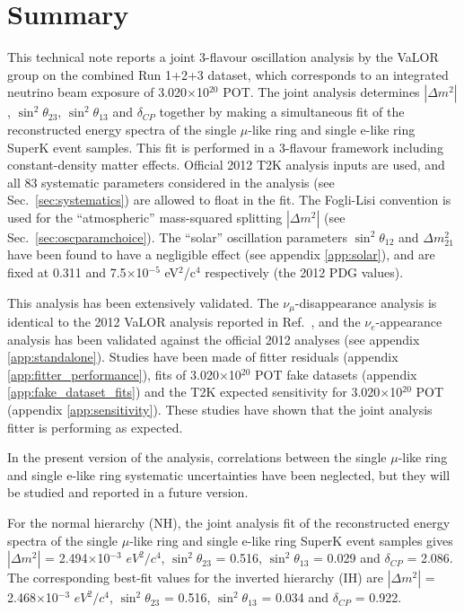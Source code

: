 \clearpage 

\section {Summary}
\label{sec:summary}

This technical note reports a joint 3-flavour oscillation analysis by the VaLOR group on the combined Run 1+2+3 dataset, 
which corresponds to an integrated neutrino beam exposure of 3.020$\times$10$^{20}$ POT. 
The joint analysis determines $|\Delta m^{2}|$, $\sin^{2} \theta_{23}$,  $\sin^{2} \theta_{13}$ and $\delta_{CP}$ together 
by making a simultaneous fit of the reconstructed energy spectra of the single $\mu$-like ring and single e-like ring SuperK event samples. 
This fit is performed in a 3-flavour framework including constant-density matter effects. Official 2012 T2K analysis inputs are used, 
and all 83 systematic parameters considered in the analysis (see Sec.\ \ref{sec:systematics}) are allowed to float in the fit. 
The Fogli-Lisi convention is used for the ``atmospheric'' mass-squared splitting $|\Delta m^{2}|$ (see Sec.\ \ref{sec:oscparamchoice}). 
The ``solar'' oscillation parameters $\sin^{2} \theta_{12}$ and $\Delta m_{21}^{2}$ have been found to have a negligible effect (see appendix \ref{app:solar}), 
and are fixed at 0.311 and 7.5$\times$10$^{-5}$ eV$^{2}$/c$^{4}$ respectively (the 2012 PDG values). 

This analysis has been extensively validated. The $\nu_{\mu}$-disappearance analysis is identical to the 2012 VaLOR analysis reported in Ref.\ \cite{OurRun123DisappAnalysis3Flavour}, 
and the $\nu_{e}$-appearance analysis has been validated against the official 2012 analyses (see appendix \ref{app:standalone}). 
Studies have been made of fitter residuals (appendix \ref{app:fitter_performance}), fits of 3.020$\times$10$^{20}$ POT fake datasets (appendix \ref{app:fake_dataset_fits}) 
and the T2K expected sensitivity for 3.020$\times$10$^{20}$ POT (appendix \ref{app:sensitivity}). These studies have shown that the joint analysis fitter is performing as expected. 

In the present version of the analysis, correlations between the single $\mu$-like ring and single e-like ring systematic uncertainties have been neglected, 
but they will be studied and reported in a future version. 

For the normal hierarchy (NH), the joint analysis fit of the reconstructed energy spectra of the single $\mu$-like ring and single e-like ring SuperK event samples gives
$|\Delta m^{2}|$ = 2.494$\times$10$^{-3}$ $eV^{2}/c^{4}$,
$\sin^{2}\theta_{23}$ = 0.516,
$\sin^{2}\theta_{13}$ = 0.029 and
$\delta_{CP}$ = 2.086.
The corresponding best-fit values for the inverted hierarchy (IH) are 
$|\Delta m^{2}|$ = 2.468$\times$10$^{-3}$ $eV^{2}/c^{4}$,
$\sin^{2}\theta_{23}$ = 0.516,
$\sin^{2}\theta_{13}$ = 0.034 and
$\delta_{CP}$ = 0.922.

